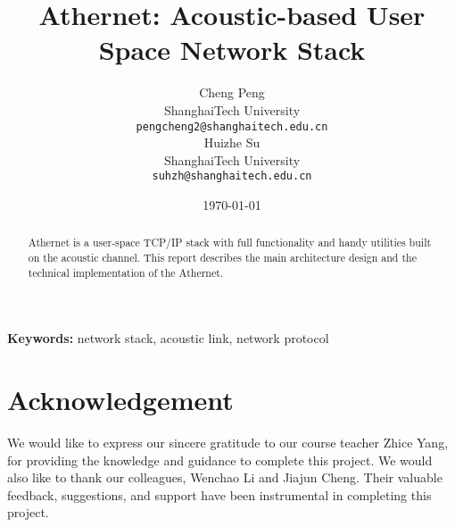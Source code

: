 \documentclass[10pt]{article}
\title{Athernet: Acoustic-based User Space Network Stack}
\author{
  Cheng Peng \\
   ShanghaiTech University   \\
  {\tt pengcheng2@shanghaitech.edu.cn} \\\And
 Huizhe Su \\
   ShanghaiTech University  \\
  {\tt suhzh@shanghaitech.edu.cn} \\}
\date{\today}
\begin{document}
\maketitle
\begin{abstract}
  Athernet is a user-space TCP/IP stack with full functionality and handy utilities built on the acoustic channel. This report describes the main architecture design and the technical implementation of the Athernet.
\end{abstract}

{\bf Keywords:} network stack, acoustic link, network protocol












\section*{Acknowledgement}
We would like to express our sincere gratitude to our course teacher Zhice Yang, for providing the knowledge and guidance to complete this project. We would also like to thank our colleagues, Wenchao Li and Jiajun Cheng. Their valuable feedback, suggestions, and support have been instrumental in completing this project.
\end{document}
